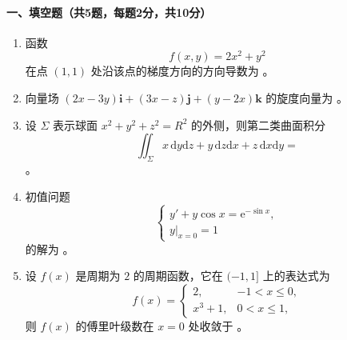 \paragraph*{一、填空题（共5题，每题2分，共10分）}
\begin{enumerate}
  \item 函数
  \[
    f(x,y)=2x^2+y^2
  \]
  在点 \((1,1)\) 处沿该点的梯度方向的方向导数为 \underline{\hspace{5cm}}。
  \item 向量场 \((2x-3y)\mathbf i+(3x-z)\mathbf j+(y-2x)\mathbf k\) 的旋度向量为 \underline{\hspace{5cm}}。
  \item 设 \(\Sigma\) 表示球面 \(x^2+y^2+z^2=R^2\) 的外侧，则第二类曲面积分
  \[
    \iint_\Sigma x\,\mathrm{d}y\mathrm{d}z+y\,\mathrm{d}z\mathrm{d}x+z\,\mathrm{d}x\mathrm{d}y=
  \]
  \underline{\hspace{5cm}}。
  \item 初值问题
  \[
    \begin{cases}
      y'+y\cos x=\mathrm{e}^{-\sin x},\\
      y|_{x=0}=1
    \end{cases}
  \]
  的解为 \underline{\hspace{5cm}}。
  \item 设 \(f(x)\) 是周期为 \(2\) 的周期函数，它在 \((-1,1]\) 上的表达式为
  \[
    f(x)=
    \begin{cases}
      2, & -1<x\le 0,\\
      x^3+1, & 0<x\le 1,
    \end{cases}
  \]
  则 \(f(x)\) 的傅里叶级数在 \(x=0\) 处收敛于 \underline{\hspace{5cm}}。
\end{enumerate}

